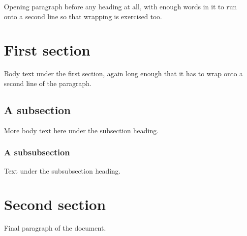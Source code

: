 \documentclass[a4paper,10pt]{article}
\begin{document}
Opening paragraph before any heading at all, with enough words in it to run
onto a second line so that wrapping is exercised too.

\section{First section}

Body text under the first section, again long enough that it has to wrap onto
a second line of the paragraph.

\subsection{A subsection}

More body text here under the subsection heading.

\subsubsection{A subsubsection}

Text under the subsubsection heading.

\section{Second section}

Final paragraph of the document.
\end{document}
